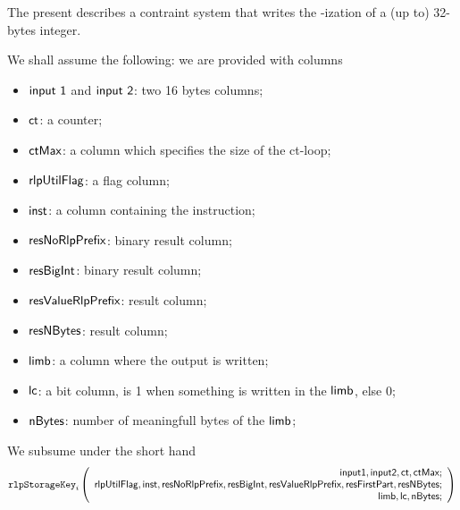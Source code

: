 The present describes a contraint system that writes the \rlp{}-ization of a (up to) 32-bytes integer.

We shall assume the following: we are provided with columns
\begin{itemize}
    \item $\textsf{input 1}$ and $\textsf{input 2}$: two 16 bytes columns;
    \item $\textsf{ct}$: a counter;
    \item $\textsf{ctMax}$: a column which specifies the size of the ct-loop;
    \item $\textsf{rlpUtilFlag}$: a flag column;
    \item $\textsf{inst}$: a column containing the instruction;
    \item $\textsf{resNoRlpPrefix}$: binary result column;
    \item $\textsf{resBigInt}$: binary result column;
    \item $\textsf{resValueRlpPrefix}$: result column;
    \item $\textsf{resNBytes}$: result column;
    \item $\textsf{limb}$: a column where the output is written;
    \item $\textsf{lc}$: a bit column, is 1 when something is written in the $\textsf{limb}$, else 0;
    \item $\textsf{nBytes}$: number of meaningfull bytes of the $\textsf{limb}$;
\end{itemize}

\noindent We subsume under the short hand
\[
    \texttt{rlpStorageKey}_{i}
    \left(
	\begin{array}{r}
    \textsf{input1},
    \textsf{input2},
    \textsf{ct},
    \textsf{ctMax}; \\
    \textsf{rlpUtilFlag},
    \textsf{inst},
    \textsf{resNoRlpPrefix},
    \textsf{resBigInt},
    \textsf{resValueRlpPrefix},
    \textsf{resFirstPart},
    \textsf{resNBytes}; \\
    \textsf{limb},
    \textsf{lc},
    \textsf{nBytes}; \\
    \end{array}
	\right)
\]

